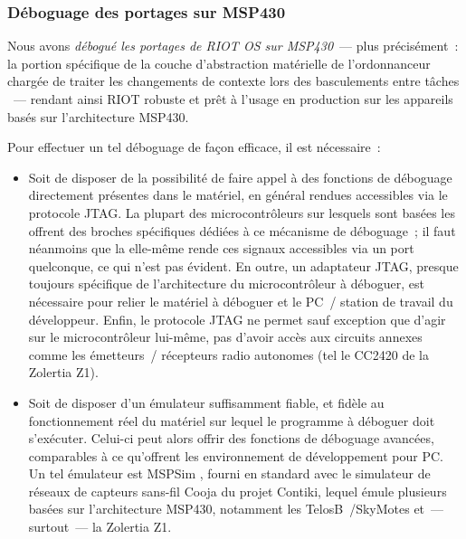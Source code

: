 \subsubsection{Déboguage des portages sur MSP430}
\label{ParRIOTDebugMSP430}

Nous avons \emph{débogué les portages de RIOT OS sur MSP430}~--- plus
précisément~: la portion spécifique de la couche d'abstraction matérielle
de l'ordonnanceur chargée de traiter les changements de contexte
lors des basculements entre tâches \cite{PRriotFix2MSP430}
\cite{PRriotFix3MSP430} \cite{PRriotFix1MSP430}~--- rendant ainsi RIOT
robuste et prêt à l'usage en production sur les appareils basés sur
l'architecture MSP430.

\smallskip

Pour effectuer un tel déboguage de façon efficace, il est nécessaire~:

\begin{itemize} 

\item Soit de disposer de la possibilité de faire appel à des fonctions
de déboguage directement présentes dans le matériel, en général rendues
accessibles via le protocole JTAG. La plupart des microcontrôleurs
sur lesquels sont basées les  offrent des broches spécifiques
dédiées à ce mécanisme de déboguage~; il faut néanmoins que la 
elle-même rende ces signaux accessibles via un port quelconque, ce qui
n'est pas évident. En outre, un adaptateur JTAG, presque toujours spécifique
de l'architecture du microcontrôleur à déboguer, est nécessaire pour relier
le matériel à déboguer et le PC~/ station de travail du développeur.
Enfin, le protocole JTAG ne permet sauf exception que d'agir sur le
microcontrôleur lui-même, pas d'avoir accès aux circuits annexes comme
les émetteurs~/ récepteurs radio autonomes (tel le CC2420 de la Zolertia
Z1).

\item Soit de disposer d'un émulateur suffisamment fiable, et fidèle au
fonctionnement réel du matériel sur lequel le programme à déboguer doit
s'exécuter. Celui-ci peut alors offrir des fonctions de déboguage avancées,
comparables à ce qu'offrent les environnement de développement pour PC.
Un tel émulateur est MSPSim \cite{MSPSim}, fourni en standard avec le
simulateur de réseaux de capteurs sans-fil Cooja \cite{Cooja} du projet
Contiki, lequel émule plusieurs  basées sur l'architecture
MSP430, notamment les TelosB~/SkyMotes et~--- surtout~--- la Zolertia Z1.

\end{itemize}

